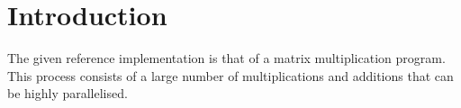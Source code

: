 \section{Introduction}
The given reference implementation is that of a matrix multiplication program. This process consists of a large number of multiplications and additions that can be highly parallelised. 
